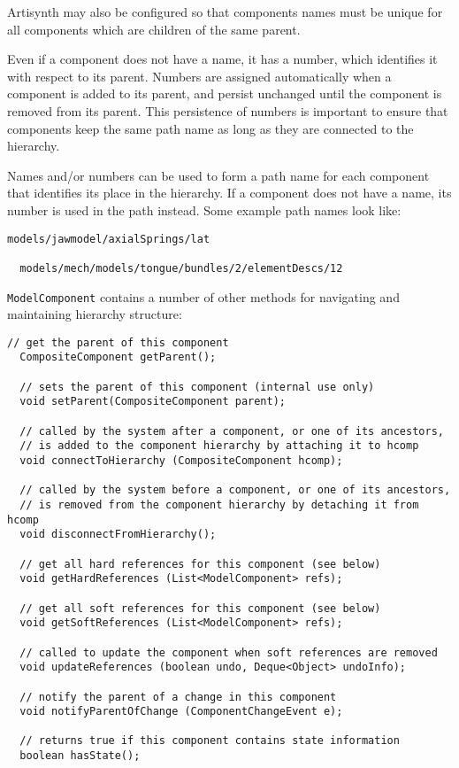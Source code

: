 \documentclass{article}
\begin{document}
Artisynth may also be configured so that components names must be
unique for all components which are children of the same parent.

Even if a component does not have a name, it has a number, which
identifies it with respect to its parent. Numbers are assigned
automatically when a component is added to its parent, and persist
unchanged until the component is removed from its parent.  This
persistence of numbers is important to ensure that components keep the
same path name as long as they are connected to the hierarchy.

Names and/or numbers can be used to form a path name for each
component that identifies its place in the hierarchy.  If a component
does not have a name, its number is used in the path instead. Some
example path names look like:

\begin{lstlisting}[]
  models/jawmodel/axialSprings/lat

  models/mech/models/tongue/bundles/2/elementDescs/12
\end{lstlisting}

{\tt ModelComponent} contains a number of other methods for navigating
and maintaining hierarchy structure:

\begin{lstlisting}[]
  // get the parent of this component
  CompositeComponent getParent();

  // sets the parent of this component (internal use only)
  void setParent(CompositeComponent parent);

  // called by the system after a component, or one of its ancestors,
  // is added to the component hierarchy by attaching it to hcomp
  void connectToHierarchy (CompositeComponent hcomp);

  // called by the system before a component, or one of its ancestors,
  // is removed from the component hierarchy by detaching it from hcomp
  void disconnectFromHierarchy();

  // get all hard references for this component (see below)
  void getHardReferences (List<ModelComponent> refs);

  // get all soft references for this component (see below)
  void getSoftReferences (List<ModelComponent> refs);

  // called to update the component when soft references are removed 
  void updateReferences (boolean undo, Deque<Object> undoInfo);

  // notify the parent of a change in this component
  void notifyParentOfChange (ComponentChangeEvent e);

  // returns true if this component contains state information
  boolean hasState();
\end{lstlisting}
\end{document}
